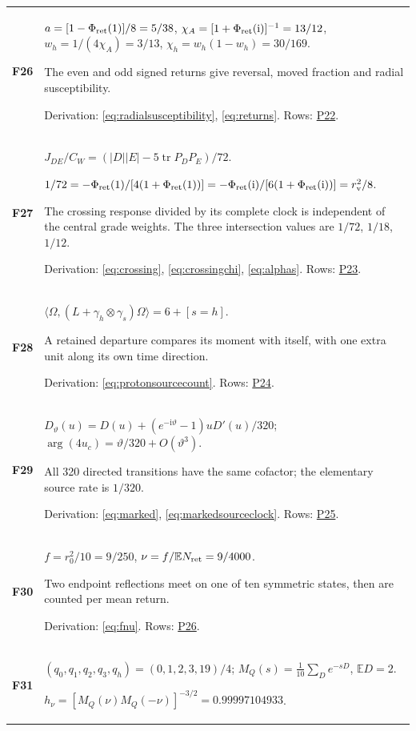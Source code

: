 \documentclass[aps,prx,onecolumn,10pt,notitlepage,nofootinbib,longbibliography]{revtex4-2}
\numberwithin{equation}{section}
\numberwithin{table}{section}
\newcommand{\EE}{\mathbb E}
\newcommand{\tr}{\operatorname{tr}}
\newcommand{\ii}{\mathrm i}
\newcommand{\Phis}{\Phi_{\rm ret}}
\begin{document}
\begin{longtable}{@{}>{\raggedright\arraybackslash}p{}>{\raggedright\arraybackslash}p{}@{}}
\hypertarget{formula-F26}{}\textbf{F26}\label{formula:F26} & $a=[1-\Phis(1)]/8=5/38$, $\chi_A=[1+\Phis(\ii)]^{-1}=13/12$, $w_h=1/(4\chi_A)=3/13$, $\chi_h=w_h(1-w_h)=30/169$.\par
The even and odd signed returns give reversal, moved fraction and radial susceptibility.\par
Derivation: \eqref{eq:radialsusceptibility}, \eqref{eq:returns}. Rows: \hyperlink{row-P22}{P22}.\\[7pt]
\hypertarget{formula-F27}{}\textbf{F27}\label{formula:F27} & $J_{DE}/C_W=(|D||E|-5\tr P_DP_E)/72$.\par $1/72=-\Phis(1)/[4(1+\Phis(1))]=-\Phis(\ii)/[6(1+\Phis(\ii))]=r_{\rm v}^2/8$.\par
The crossing response divided by its complete clock is independent of the central grade weights. The three intersection values are $1/72$, $1/18$, $1/12$.\par
Derivation: \eqref{eq:crossing}, \eqref{eq:crossingchi}, \eqref{eq:alphas}. Rows: \hyperlink{row-P23}{P23}.\\[7pt]
\hypertarget{formula-F28}{}\textbf{F28}\label{formula:F28} & $\langle\Omega,(L+\gamma_h\otimes\gamma_s)\Omega\rangle=6+[s=h]$.\par
A retained departure compares its moment with itself, with one extra unit along its own time direction.\par
Derivation: \eqref{eq:protonsourcecount}. Rows: \hyperlink{row-P24}{P24}.\\[7pt]
\hypertarget{formula-F29}{}\textbf{F29}\label{formula:F29} & $D_\vartheta(u)=D(u)+(e^{-\ii\vartheta}-1)uD'(u)/320$; $\arg(4u_c)=\vartheta/320+O(\vartheta^3)$.\par
All 320 directed transitions have the same cofactor; the elementary source rate is $1/320$.\par
Derivation: \eqref{eq:marked}, \eqref{eq:markedsourceclock}. Rows: \hyperlink{row-P25}{P25}.\\[7pt]
\hypertarget{formula-F30}{}\textbf{F30}\label{formula:F30} & $f=r_0^2/10=9/250$, $\nu=f/\EE N_{\rm ret}=9/4000$.\par
Two endpoint reflections meet on one of ten symmetric states, then are counted per mean return.\par
Derivation: \eqref{eq:fnu}. Rows: \hyperlink{row-P26}{P26}.\\[7pt]
\hypertarget{formula-F31}{}\textbf{F31}\label{formula:F31} & $(q_0,q_1,q_2,q_3,q_h)=(0,1,2,3,19)/4$; $M_Q(s)=\frac1{10}\sum_De^{-sD}$, $\EE D=2$.\par $h_\nu=[M_Q(\nu)M_Q(-\nu)]^{-3/2}=0.99997104933$.\par

\end{longtable}
\end{document}

